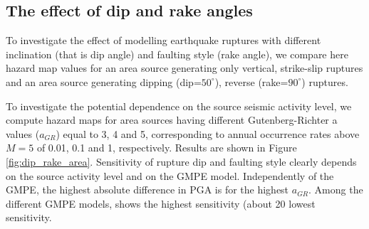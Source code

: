 \subsection{The effect of dip and rake angles}
To investigate the effect of modelling earthquake ruptures with different
inclination (that is dip angle) and faulting style (rake angle), we compare here
hazard map values for an area source generating only vertical, strike-slip
ruptures and an area source generating dipping (dip=$50^{\circ}$), reverse
(rake=$90^{\circ}$) ruptures.

To investigate the potential dependence on the source seismic activity level, we
compute hazard maps for area sources having different Gutenberg-Richter a values
($a_{GR}$) equal to 3, 4 and 5, corresponding to annual occurrence rates above
$M=5$ of 0.01, 0.1 and 1, respectively. Results are shown in Figure
\ref{fig:dip_rake_area}. Sensitivity of rupture dip and faulting style clearly
depends on the source activity level and on the GMPE model. Independently of the
GMPE, the highest absolute difference in PGA is for the highest $a_{GR}$. Among
the different GMPE models, \citet{campbell2008} shows the highest sensitivity
(about 20 %
lowest sensitivity.
